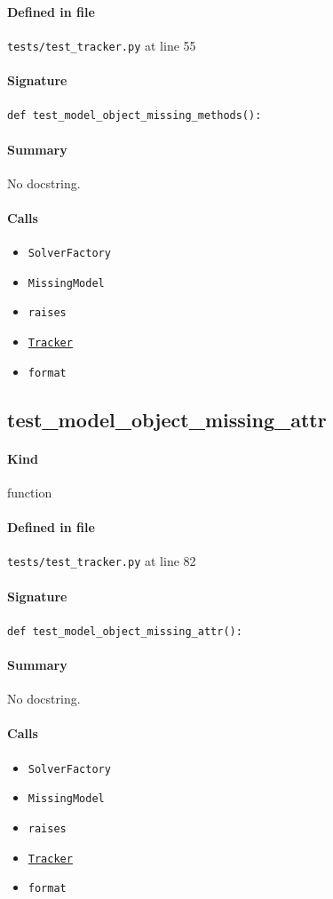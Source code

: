 \documentclass[11pt]{report}
\begin{document}
\paragraph{Defined in file} \texttt{tests/test\_tracker.py} at line 55
\paragraph{Signature} \texttt{def test\_model\_object\_missing\_methods():}
\paragraph{Summary} No docstring.
\paragraph{Calls}
\begin{itemize}[leftmargin=*]
  \item \texttt{SolverFactory}
  \item \texttt{MissingModel}
  \item \texttt{raises}
  \item \hyperref[def:tracker.py:Tracker:L19]{\texttt{Tracker}}
  \item \texttt{format}
\end{itemize}
\subsection{test\_model\_object\_missing\_attr}
\label{def:tests-test_tracker.py:test_model_object_missing_attr:L82}
\paragraph{Kind} function
\paragraph{Defined in file} \texttt{tests/test\_tracker.py} at line 82
\paragraph{Signature} \texttt{def test\_model\_object\_missing\_attr():}
\paragraph{Summary} No docstring.
\paragraph{Calls}
\begin{itemize}[leftmargin=*]
  \item \texttt{SolverFactory}
  \item \texttt{MissingModel}
  \item \texttt{raises}
  \item \hyperref[def:tracker.py:Tracker:L19]{\texttt{Tracker}}
  \item \texttt{format}
\end{itemize}
\end{document}
